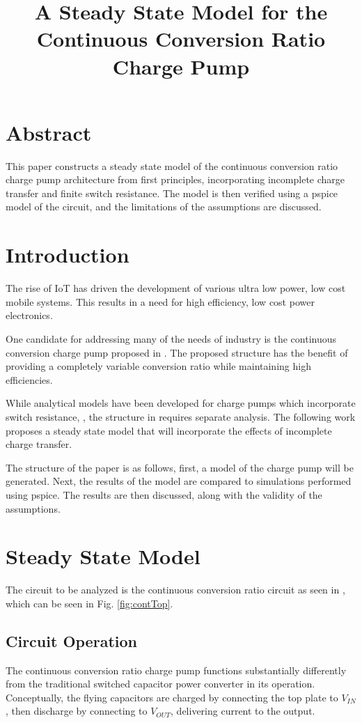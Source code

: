 \documentclass[conference]{IEEEtran}
\title{A Steady State Model for the Continuous Conversion Ratio Charge Pump}
\begin{document}
	\maketitle
	\section{Abstract}
	This paper constructs a steady state model of the continuous conversion ratio charge pump architecture from first principles, incorporating incomplete charge transfer and finite switch resistance. The model is then verified using a pspice model of the circuit, and the limitations of the assumptions are discussed.
	\section{Introduction}
	The rise of IoT has driven the development of various ultra low power, low cost mobile systems. This results in a need for high efficiency, low cost power electronics.
	
	One candidate for addressing many of the needs of industry is the continuous conversion charge pump proposed in \cite{Butzen2019	}. The proposed structure has the benefit of providing a completely variable conversion ratio while maintaining high efficiencies. 

	While analytical models have been developed for charge pumps which incorporate switch resistance, \cite{Tanzawa2011}, the structure in \cite{Butzen2019} requires separate analysis. The following work proposes a steady state model that will incorporate the effects of incomplete charge transfer.
	
	The structure of the paper is as follows, first, a model of the charge pump will be generated. Next, the results of the model are compared to simulations performed using pspice. The results are then discussed, along with the validity of the assumptions.
	\section{Steady State Model}
	The circuit to be analyzed is the continuous conversion ratio circuit as seen in \cite{Butzen2019}, which can be seen in Fig. \ref{fig:contTop}. 
	\subsection{Circuit Operation}
	The continuous conversion ratio charge pump functions substantially differently from the traditional switched capacitor power converter in its operation. Conceptually, the flying capacitors are charged by connecting the top plate to $V_{IN}$, then discharge by connecting to $V_{OUT}$, delivering current to the output.
	
\end{document}
